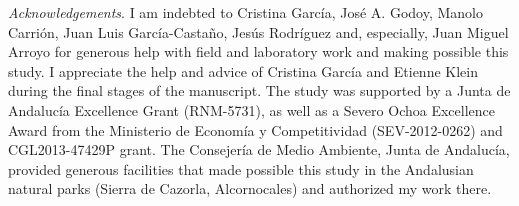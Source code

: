 \documentclass[a4paper, 12pt]{article}
\begin{document}
\begin{linenumbers}
\newpage

\emph{Acknowledgements}. I am indebted to Cristina García, José A. Godoy, Manolo Carrión, Juan Luis García-Castaño, Jesús Rodríguez and, especially, Juan Miguel Arroyo for generous help with field and laboratory work and making possible this study. I appreciate the help and advice of Cristina García and Etienne Klein during the final stages of the manuscript. The study was supported by a Junta de Andalucía Excellence Grant (RNM-5731), as well as a Severo Ochoa Excellence Award from the Ministerio de Economía y Competitividad (SEV-2012-0262) and CGL2013-47429P grant. The Consejería de Medio Ambiente, Junta de Andalucía, provided generous facilities that made possible this study in the Andalusian natural parks (Sierra de Cazorla, Alcornocales) and authorized my work there.

\end{linenumbers}

\newpage




\newpage
\end{document}
